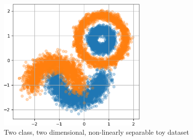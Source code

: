 \documentclass[12pt,oneside]{CUNY_PhD}
\begin{document}
\begin{figure}[!htbp]
    \centering
        \includegraphics[width=0.66\textwidth]{images/2D-network-toy/2d-toy-data.png}
    \caption{Two class, two dimensional, non-linearly separable toy dataset}
    \label{fig:toy-2d-data}
\end{figure}\\
\end{document}
